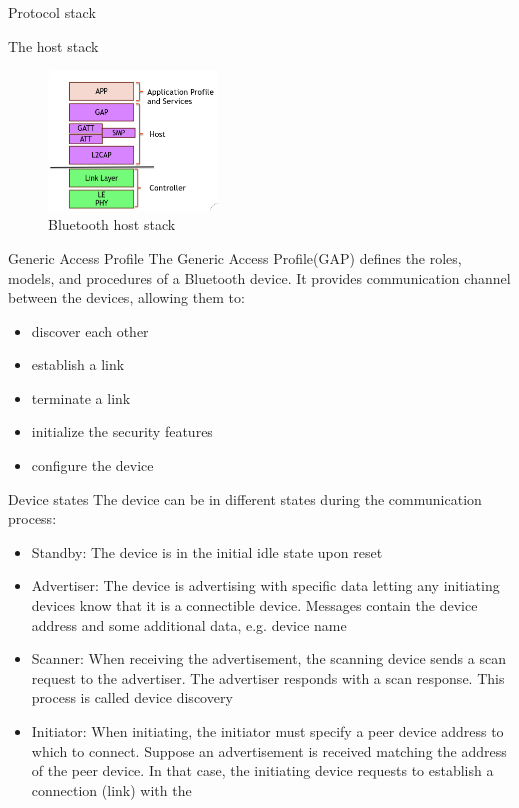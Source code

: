 \begin{section}{Protocol stack}
\begin{subsection}{The host stack}
\begin{figure}[H]
      \centering
      \includegraphics[width=0.4\textwidth]{img/wireless/bluetooth host stack.png}
      \caption{Bluetooth host stack}
    \end{figure}
    \begin{subsubsection}{Generic Access Profile}
      The Generic Access Profile(GAP) defines the roles, models, and procedures of a Bluetooth device.
      It provides communication channel between the devices, allowing them to:
      \begin{itemize}
        \item discover each other
        \item establish a link 
        \item terminate a link
        \item initialize the security features
        \item configure the device
      \end{itemize}
    \end{subsubsection}
    \begin{subsubsection}{Device states}
      The device can be in different states during the communication process:
      \begin{itemize}
      \item Standby: The device is in the initial idle state upon reset
      \item Advertiser: The device is advertising with specific data letting any initiating devices
        know that it is a connectible device. Messages contain the device address and some
        additional data, e.g. device name
      \item Scanner: When receiving the advertisement, the scanning device sends a scan request to
        the advertiser. The advertiser responds with a scan response. This process is called device
        discovery
      \item Initiator: When initiating, the initiator must specify a peer device address to which to
        connect. Suppose an advertisement is received matching the address of the peer device. In
        that case, the initiating device requests to establish a connection (link) with the

\end{itemize}
\end{subsubsection}
\end{subsection}
\end{section}
